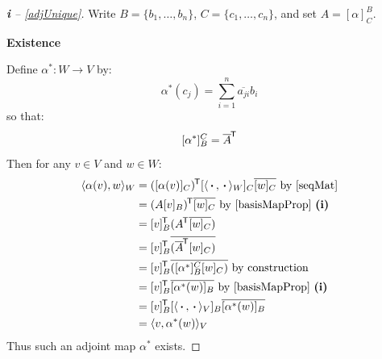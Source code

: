 \documentclass[../main.tex]{subfiles}
\begin{document}
\begin{proof}[\textbf{i} -- \cref{adjUnique}]
  Write $B = \{b_1, \ldots, b_n\}$, $C = \{c_1, \ldots, c_n\}$, and set $A = [\alpha]^{B}_{C}$.

  \textbf{Existence}\par
  Define $\alpha^{*}: W \to V$ by:
  \[
    \alpha^{*}(c_j) = \sum_{i = 1}^{n} \overline{a_{j i}} b_i
  \]
  so that:
  \[
    [\alpha^{*}]^{C}_{B} = \overline{A}^{{\mkern-1.5mu\mathsf{T}}}
  \]
  Then for any $v \in V$ and $w \in W$:
  \begin{align*}
    \langle \alpha(v), w \rangle_{W} &= ([\alpha(v)]_C)^{\trans} [\langle \argdot, \argdot \rangle_W]_C \overline{[w]_{C}} \text{ by \cref{seqMat}} \\
                                     &= (A[v]_{B})^{\trans}\overline{[w]_{C}} \text{ by \cref{basisMapProp} \textbf{(i)}} \\
                                     &= [v]^{\trans}_B (A^{\trans} \overline{[w]_C}) \\
                                     &= [v]^{\trans}_B \overline{(\overline{A}^{\trans} [w]_C)} \\
                                     &= [v]^{\trans}_B \overline{([\alpha^{*}]^{C}_{B} [w]_C)} \text{ by construction} \\
                                     &= [v]^{\trans}_B \overline{[\alpha^{*}(w)]_B} \text{ by \cref{basisMapProp} \textbf{(i)}} \\
                                     &= [v]^{\trans}_B [\langle \argdot, \argdot \rangle_V]_B \overline{[\alpha^{*}(w)]_B} \\
                                     &= \langle v, \alpha^{*}(w) \rangle_{V}
  \end{align*}
  Thus such an adjoint map $\alpha^{*}$ exists.


\end{proof}
\end{document}
